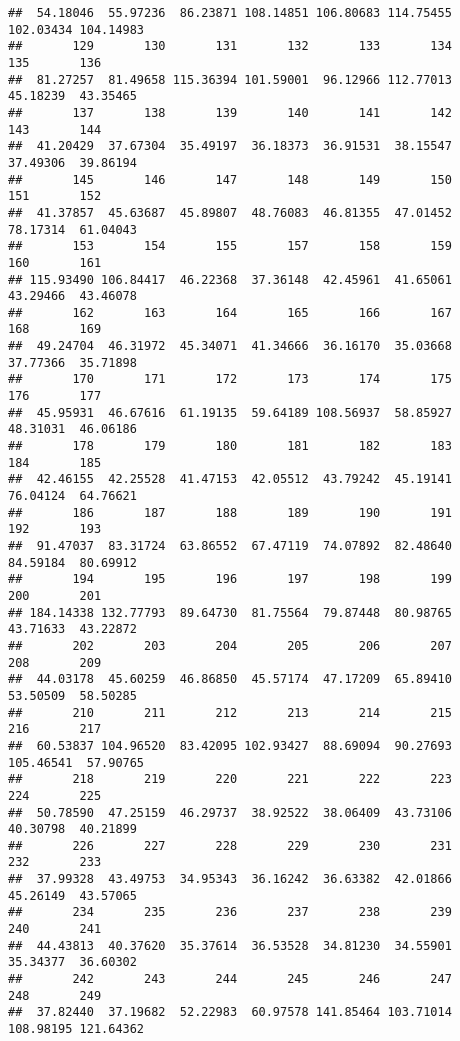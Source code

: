 \documentclass[
]{article}
\begin{document}
\begin{verbatim}
##  54.18046  55.97236  86.23871 108.14851 106.80683 114.75455 102.03434 104.14983 
##       129       130       131       132       133       134       135       136 
##  81.27257  81.49658 115.36394 101.59001  96.12966 112.77013  45.18239  43.35465 
##       137       138       139       140       141       142       143       144 
##  41.20429  37.67304  35.49197  36.18373  36.91531  38.15547  37.49306  39.86194 
##       145       146       147       148       149       150       151       152 
##  41.37857  45.63687  45.89807  48.76083  46.81355  47.01452  78.17314  61.04043 
##       153       154       155       157       158       159       160       161 
## 115.93490 106.84417  46.22368  37.36148  42.45961  41.65061  43.29466  43.46078 
##       162       163       164       165       166       167       168       169 
##  49.24704  46.31972  45.34071  41.34666  36.16170  35.03668  37.77366  35.71898 
##       170       171       172       173       174       175       176       177 
##  45.95931  46.67616  61.19135  59.64189 108.56937  58.85927  48.31031  46.06186 
##       178       179       180       181       182       183       184       185 
##  42.46155  42.25528  41.47153  42.05512  43.79242  45.19141  76.04124  64.76621 
##       186       187       188       189       190       191       192       193 
##  91.47037  83.31724  63.86552  67.47119  74.07892  82.48640  84.59184  80.69912 
##       194       195       196       197       198       199       200       201 
## 184.14338 132.77793  89.64730  81.75564  79.87448  80.98765  43.71633  43.22872 
##       202       203       204       205       206       207       208       209 
##  44.03178  45.60259  46.86850  45.57174  47.17209  65.89410  53.50509  58.50285 
##       210       211       212       213       214       215       216       217 
##  60.53837 104.96520  83.42095 102.93427  88.69094  90.27693 105.46541  57.90765 
##       218       219       220       221       222       223       224       225 
##  50.78590  47.25159  46.29737  38.92522  38.06409  43.73106  40.30798  40.21899 
##       226       227       228       229       230       231       232       233 
##  37.99328  43.49753  34.95343  36.16242  36.63382  42.01866  45.26149  43.57065 
##       234       235       236       237       238       239       240       241 
##  44.43813  40.37620  35.37614  36.53528  34.81230  34.55901  35.34377  36.60302 
##       242       243       244       245       246       247       248       249 
##  37.82440  37.19682  52.22983  60.97578 141.85464 103.71014 108.98195 121.64362 

\end{verbatim}
\end{document}
